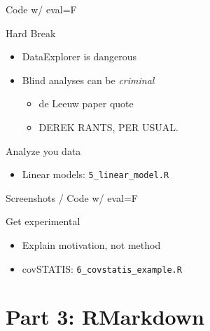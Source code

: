 \documentclass[
  ignorenonframetext,
]{beamer}
\providecommand{\tightlist}{%
  \setlength{\itemsep}{0pt}\setlength{\parskip}{0pt}}
\begin{document}
\begin{frame}{Code w/ eval=F}
\protect\hypertarget{code-w-evalf}{}

\end{frame}

\begin{frame}{Hard Break}
\protect\hypertarget{hard-break}{}

\begin{itemize}
\tightlist
\item
  DataExplorer is dangerous
\item
  Blind analyses can be \emph{criminal}

  \begin{itemize}
  \tightlist
  \item
    de Leeuw paper quote
  \item
    DEREK RANTS, PER USUAL.
  \end{itemize}
\end{itemize}

\end{frame}

\begin{frame}[fragile]{Analyze you data}
\protect\hypertarget{analyze-you-data}{}

\begin{itemize}
\tightlist
\item
  Linear models: \texttt{5\_linear\_model.R}
\end{itemize}

\end{frame}

\begin{frame}{Screenshots / Code w/ eval=F}
\protect\hypertarget{screenshots-code-w-evalf}{}

\end{frame}

\begin{frame}[fragile]{Get experimental}
\protect\hypertarget{get-experimental}{}

\begin{itemize}
\tightlist
\item
  Explain motivation, not method
\item
  covSTATIS: \texttt{6\_covstatis\_example.R}
\end{itemize}

\end{frame}

\hypertarget{part-3-rmarkdown}{%
\section{Part 3: RMarkdown}\label{part-3-rmarkdown}}
\end{document}
